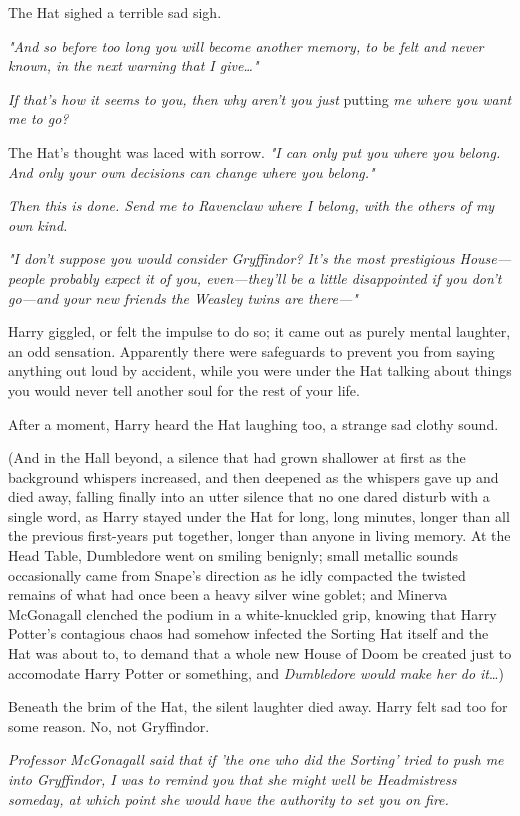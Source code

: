 The Hat sighed a terrible sad sigh.

\emph{"And so before too long you will become another memory, to be felt and never known, in the next warning that I give{\ldots}"}

\emph{If that's how it seems to you, then why aren't you just} putting\emph{ me where you want me to go?}

The Hat's thought was laced with sorrow. \emph{"I can only put you where you belong. And only your own decisions can change where you belong."}

\emph{Then this is done. Send me to Ravenclaw where I belong, with the others of my own kind.}

\emph{"I don't suppose you would consider Gryffindor? It's the most prestigious House---people probably expect it of you, even---they'll be a little disappointed if you don't go---and your new friends the Weasley twins are there---"}

Harry giggled, or felt the impulse to do so; it came out as purely mental laughter, an odd sensation. Apparently there were safeguards to prevent you from saying anything out loud by accident, while you were under the Hat talking about things you would never tell another soul for the rest of your life.

After a moment, Harry heard the Hat laughing too, a strange sad clothy sound.

(And in the Hall beyond, a silence that had grown shallower at first as the background whispers increased, and then deepened as the whispers gave up and died away, falling finally into an utter silence that no one dared disturb with a single word, as Harry stayed under the Hat for long, long minutes, longer than all the previous first-years put together, longer than anyone in living memory. At the Head Table, Dumbledore went on smiling benignly; small metallic sounds occasionally came from Snape's direction as he idly compacted the twisted remains of what had once been a heavy silver wine goblet; and Minerva McGonagall clenched the podium in a white-knuckled grip, knowing that Harry Potter's contagious chaos had somehow infected the Sorting Hat itself and the Hat was about to, to demand that a whole new House of Doom be created just to accomodate Harry Potter or something, and \emph{Dumbledore would make her do it}{\ldots})

Beneath the brim of the Hat, the silent laughter died away. Harry felt sad too for some reason. No, not Gryffindor.

\emph{Professor McGonagall said that if 'the one who did the Sorting' tried to push me into Gryffindor, I was to remind you that she might well be Headmistress someday, at which point she would have the authority to set you on fire.}

